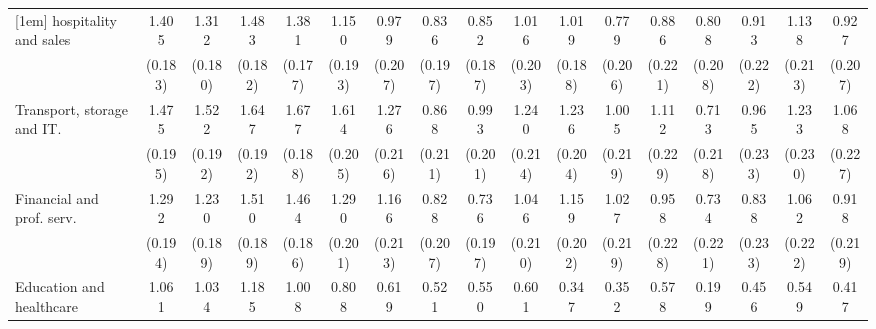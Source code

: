 {\begin{tabular}{l*{16}{c}}
[1em]
hospitality and sales&       1.405\sym{***}&       1.312\sym{***}&       1.483\sym{***}&       1.381\sym{***}&       1.150\sym{***}&       0.979\sym{***}&       0.836\sym{***}&       0.852\sym{***}&       1.016\sym{***}&       1.019\sym{***}&       0.779\sym{***}&       0.886\sym{***}&       0.808\sym{***}&       0.913\sym{***}&       1.138\sym{***}&       0.927\sym{***}\\
                    &     (0.183)         &     (0.180)         &     (0.182)         &     (0.177)         &     (0.193)         &     (0.207)         &     (0.197)         &     (0.187)         &     (0.203)         &     (0.188)         &     (0.206)         &     (0.221)         &     (0.208)         &     (0.222)         &     (0.213)         &     (0.207)         \\
[1em]
Transport, storage and IT.&       1.475\sym{***}&       1.522\sym{***}&       1.647\sym{***}&       1.677\sym{***}&       1.614\sym{***}&       1.276\sym{***}&       0.868\sym{***}&       0.993\sym{***}&       1.240\sym{***}&       1.236\sym{***}&       1.005\sym{***}&       1.112\sym{***}&       0.713\sym{**} &       0.965\sym{***}&       1.233\sym{***}&       1.068\sym{***}\\
                    &     (0.195)         &     (0.192)         &     (0.192)         &     (0.188)         &     (0.205)         &     (0.216)         &     (0.211)         &     (0.201)         &     (0.214)         &     (0.204)         &     (0.219)         &     (0.229)         &     (0.218)         &     (0.233)         &     (0.230)         &     (0.227)         \\
[1em]
Financial and prof. serv.&       1.292\sym{***}&       1.230\sym{***}&       1.510\sym{***}&       1.464\sym{***}&       1.290\sym{***}&       1.166\sym{***}&       0.828\sym{***}&       0.736\sym{***}&       1.046\sym{***}&       1.159\sym{***}&       1.027\sym{***}&       0.958\sym{***}&       0.734\sym{***}&       0.838\sym{***}&       1.062\sym{***}&       0.918\sym{***}\\
                    &     (0.194)         &     (0.189)         &     (0.189)         &     (0.186)         &     (0.201)         &     (0.213)         &     (0.207)         &     (0.197)         &     (0.210)         &     (0.202)         &     (0.219)         &     (0.228)         &     (0.221)         &     (0.233)         &     (0.222)         &     (0.219)         \\
[1em]
Education and healthcare&       1.061\sym{***}&       1.034\sym{***}&       1.185\sym{***}&       1.008\sym{***}&       0.808\sym{***}&       0.619\sym{**} &       0.521\sym{*}  &       0.550\sym{*}  &       0.601\sym{**} &       0.347         &       0.352         &       0.578\sym{*}  &       0.199         &       0.456         &       0.549\sym{*}  &       0.417         \\

\end{tabular}}
